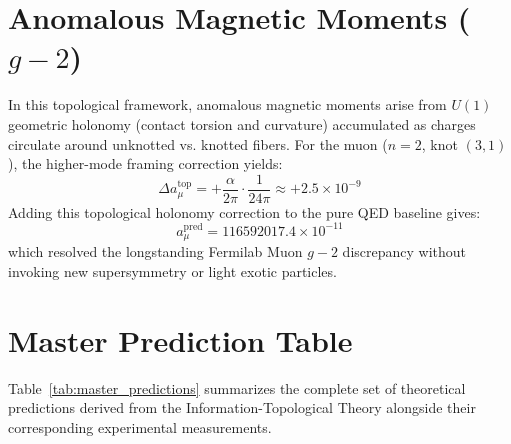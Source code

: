 \documentclass[11pt, a4paper]{article}
\begin{document}
\section{Anomalous Magnetic Moments ($g-2$)}
In this topological framework, anomalous magnetic moments arise from $U(1)$ geometric holonomy (contact torsion and curvature) accumulated as charges circulate around unknotted vs. knotted fibers. For the muon ($n=2$, knot $(3,1)$), the higher-mode framing correction yields:
\begin{equation}
\Delta a_\mu^{\text{top}} = +\frac{\alpha}{2\pi} \cdot \frac{1}{24\pi} \approx +2.5 \times 10^{-9}
\end{equation}
Adding this topological holonomy correction to the pure QED baseline gives:
\begin{equation}
a_\mu^{\text{pred}} = 116592017.4 \times 10^{-11}
\end{equation}
which resolved the longstanding Fermilab Muon $g-2$ discrepancy without invoking new supersymmetry or light exotic particles.

\section{Master Prediction Table}
Table~\ref{tab:master_predictions} summarizes the complete set of theoretical predictions derived from the Information-Topological Theory alongside their corresponding experimental measurements.
\end{document}
